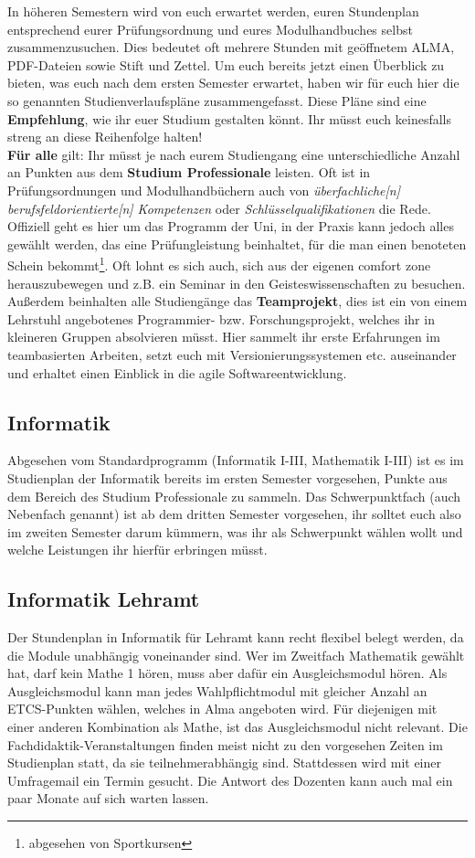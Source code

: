 In höheren Semestern wird von euch erwartet werden, euren Stundenplan entsprechend eurer Prüfungsordnung und eures Modulhandbuches selbst zusammenzusuchen. Dies bedeutet oft mehrere Stunden mit geöffnetem ALMA, PDF-Dateien sowie Stift und Zettel. Um euch bereits jetzt einen Überblick zu bieten,
was euch nach dem ersten Semester erwartet, haben wir für euch hier die so genannten Studienverlaufspläne zusammengefasst. Diese Pläne sind eine \textbf{Empfehlung}, wie ihr euer Studium gestalten könnt. Ihr müsst euch keinesfalls streng an diese Reihenfolge halten! \medskip
\\
\textbf{Für alle} gilt: Ihr müsst je nach eurem Studiengang eine unterschiedliche Anzahl an Punkten aus dem \textbf{Studium Professionale} leisten. Oft ist in Prüfungsordnungen und Modulhandbüchern auch von \emph{überfachliche[n] berufsfeldorientierte[n] Kompetenzen} oder \emph{Schlüsselqualifikationen} die Rede. Offiziell geht es hier um das Programm der Uni, in der Praxis kann jedoch alles gewählt werden, das eine Prüfungleistung beinhaltet, für die man einen benoteten Schein bekommt\footnote{abgesehen von Sportkursen}. Oft lohnt es sich auch, sich aus der eigenen comfort zone herauszubewegen und z.B. ein Seminar in den Geisteswissenschaften zu besuchen.\\
Außerdem beinhalten alle Studiengänge das \textbf{Teamprojekt}, dies ist ein von einem Lehrstuhl angebotenes Programmier- bzw. Forschungsprojekt, welches ihr in kleineren Gruppen absolvieren müsst. Hier sammelt ihr erste Erfahrungen im teambasierten Arbeiten, setzt euch mit Versionierungssystemen etc. auseinander und erhaltet einen Einblick in die agile Softwareentwicklung.
\vfill \pagebreak 
\subsection*{Informatik}
	
Abgesehen vom Standardprogramm (Informatik I-III, Mathematik I-III) ist es im Studienplan der Informatik bereits im ersten Semester vorgesehen, Punkte aus dem Bereich des Studium Professionale zu sammeln.  Das Schwerpunktfach (auch Nebenfach genannt) ist ab dem dritten Semester vorgesehen, ihr solltet euch also im zweiten Semester darum kümmern, was ihr als Schwerpunkt wählen wollt und welche Leistungen ihr hierfür erbringen müsst.
\subsection*{Informatik Lehramt}
	
\pagebreak 
Der Stundenplan in Informatik für Lehramt kann recht flexibel belegt werden, da die Module unabhängig voneinander sind. Wer im Zweitfach Mathematik gewählt hat, darf kein Mathe 1 hören, muss aber dafür ein Ausgleichsmodul hören. Als Ausgleichsmodul kann man jedes Wahlpflichtmodul mit gleicher Anzahl an ETCS-Punkten wählen, welches in Alma angeboten wird. Für diejenigen mit einer anderen Kombination als Mathe, ist das Ausgleichsmodul nicht relevant. Die Fachdidaktik-Veranstaltungen finden meist nicht zu den vorgesehen Zeiten im Studienplan statt, da sie teilnehmerabhängig sind. Stattdessen wird mit einer Umfragemail ein Termin gesucht. Die Antwort des Dozenten kann auch mal ein paar Monate auf sich warten lassen.
